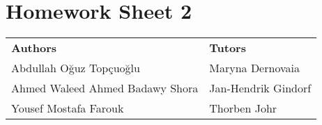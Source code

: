 \documentclass{article}
\begin{document}
\section*{\huge Homework Sheet 2}
\begin{flushright}
  \begin{tabular}{@{} l l @{}}
    \textbf{Authors} & \textbf{Tutors} \\
    Abdullah Oğuz Topçuoğlu & Maryna Dernovaia \\
    Ahmed Waleed Ahmed Badawy Shora & Jan-Hendrik Gindorf \\
    Yousef Mostafa Farouk & 
    Thorben Johr \\
  \end{tabular}
\end{flushright}

\end{document}
